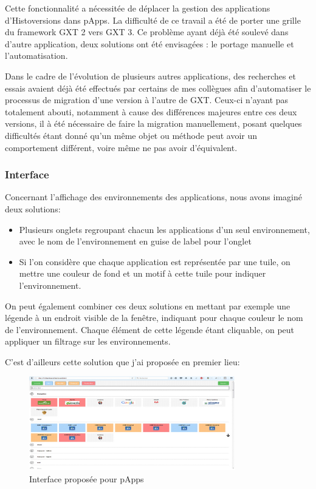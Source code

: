 \documentclass[12pt]{report}
\begin{document}
    \label{portageEcranApplications}
    Cette fonctionnalité a nécessitée de déplacer la gestion des applications d'Histoversions dans pApps. La difficulté de ce travail a été de porter une grille du framework GXT 2 vers GXT 3. Ce problème ayant déjà été soulevé dans d'autre application, deux solutions ont été envisagées : le portage manuelle et l'automatisation.
    
    Dans le cadre de l'évolution de plusieurs autres applications, des recherches et essais avaient déjà été effectués par certains de mes collègues afin d'automatiser le processus de migration d'une version à l'autre de GXT. Ceux-ci n'ayant pas totalement abouti, notamment à cause des différences majeures entre ces deux versions, il à été nécessaire de faire la migration manuellement, posant quelques difficultés étant donné qu'un même objet ou méthode peut avoir un comportement différent, voire même ne pas avoir d'équivalent.
    
    \subsubsection{Interface}
    Concernant l'affichage des environnements des applications, nous avons imaginé deux solutions:\vspace{-1em}
    \begin{itemize}
        \item Plusieurs onglets regroupant chacun les applications d'un seul environnement, avec le nom de l'environnement en guise de label pour l'onglet
        \item Si l'on considère que chaque application est représentée par une tuile, on mettre une couleur de fond et un motif à cette tuile pour indiquer l'environnement.
    \end{itemize}
    On peut également combiner ces deux solutions en mettant par exemple une légende à un endroit visible de la fenêtre, indiquant pour chaque couleur le nom de l'environnement. Chaque élément de cette légende étant cliquable, on peut appliquer un filtrage sur les environnements.
    
    C'est d'ailleurs cette solution que j'ai proposée en premier lieu:
    
    \begin{figure}[ht]
        \centering
        \includegraphics[width=0.8\textwidth]{img/interface_proposition_sfd.jpg}
        \caption{Interface proposée pour pApps}
        \label{fig:papps_interface_proposée}
    \end{figure}
    
\end{document}
